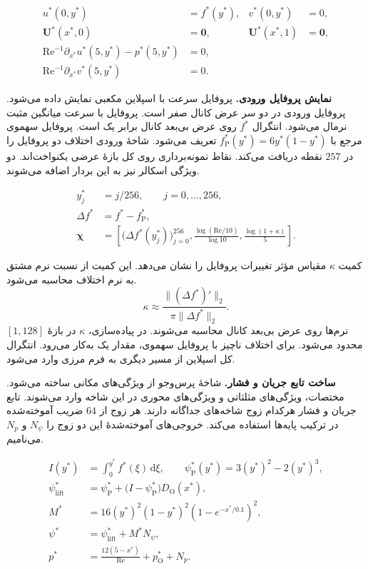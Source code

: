 \begin{equation}
\begin{aligned}
u^*(0,y^*)&=f^*(y^*), & v^*(0,y^*)&=0,\\
\mathbf U^*(x^*,0)&=\mathbf 0, &
\mathbf U^*(x^*,1)&=\mathbf 0,\\
\mathrm{Re}^{-1}\partial_{x^*}u^*(5,y^*)-p^*(5,y^*)&=0,\\
\mathrm{Re}^{-1}\partial_{x^*}v^*(5,y^*)&=0.
\end{aligned}
\label{eq:forward-flow-boundaries}
\end{equation}

\textbf{نمایش پروفایل ورودی.}
پروفایل سرعت با اسپلاین مکعبی نمایش داده می‌شود.
پروفایل ورودی در دو سر عرض کانال صفر است.
پروفایل با سرعت میانگین مثبت نرمال می‌شود.
انتگرال $f^*$ روی عرض بی‌بعد کانال برابر یک است.
پروفایل سهموی مرجع با $f_{\mathrm P}^*(y^*)=6y^*(1-y^*)$ تعریف می‌شود.
شاخهٔ ورودی اختلاف دو پروفایل را در $257$ نقطه دریافت می‌کند.
نقاط نمونه‌برداری روی کل بازهٔ عرضی یکنواخت‌اند.
دو ویژگی اسکالر نیز به این بردار اضافه می‌شوند.

\begin{equation}
\begin{aligned}
y_j^*&=j/256,\qquad j=0,\ldots,256,\\
\Delta f^*&=f^*-f_{\mathrm P}^*,\\
\boldsymbol\chi&=
\left[
\big(\Delta f^*(y_j^*)\big)_{j=0}^{256},
\frac{\log(\mathrm{Re}/10)}{\log 10},
\frac{\log(1+\kappa)}{5}
\right].
\end{aligned}
\label{eq:forward-flow-branch-input}
\end{equation}

کمیت $\kappa$ مقیاس مؤثر تغییرات پروفایل را نشان می‌دهد.
این کمیت از نسبت نرم مشتق به نرم اختلاف محاسبه می‌شود.
\[
\kappa \approx \frac{\|(\Delta f^*)'\|_2}{\pi\|\Delta f^*\|_2}.
\]
نرم‌ها روی عرض بی‌بعد کانال محاسبه می‌شوند.
در پیاده‌سازی، $\kappa$ در بازهٔ $[1,128]$ محدود می‌شود.
برای اختلاف ناچیز با پروفایل سهموی، مقدار یک به‌کار می‌رود.
انتگرال کل اسپلاین از مسیر دیگری به فرم مرزی وارد می‌شود.

\textbf{ساخت تابع جریان و فشار.}
شاخهٔ پرس‌وجو از ویژگی‌های مکانی ساخته می‌شود.
مختصات، ویژگی‌های مثلثاتی و ویژگی‌های محوری در این شاخه وارد می‌شوند.
تابع جریان و فشار هرکدام زوج شاخه‌های جداگانه دارند.
هر زوج از $64$ ضریب آموخته‌شده در ترکیب پایه‌ها استفاده می‌کند.
خروجی‌های آموخته‌شدهٔ این دو زوج را $N_\psi$ و $N_p$ می‌نامیم.

\begin{equation}
\begin{aligned}
I(y^*)&=\int_0^{y^*} f^*(\xi)\,\mathrm d\xi,\qquad
\psi_{\mathrm P}^*(y^*)=3(y^*)^2-2(y^*)^3,\\
\psi_{\mathrm{lift}}^*
&=\psi_{\mathrm P}^*+\big(I-\psi_{\mathrm P}^*\big)D_{\mathrm O}(x^*),\\
M^*&=16(y^*)^2(1-y^*)^2(1-e^{-x^*/0.1})^2,\\
\psi^*&=\psi_{\mathrm{lift}}^*+M^*N_\psi,\\
p^*&=\frac{12(5-x^*)}{\mathrm{Re}}+p_{\mathrm O}^*+N_p.
\end{aligned}
\label{eq:forward-flow-lift}
\end{equation}

